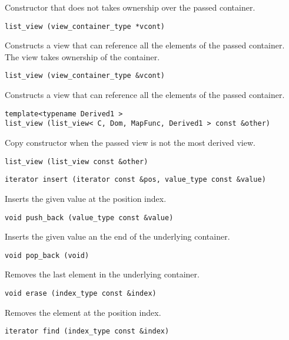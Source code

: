 Constructor that does not takes ownership over the passed container.

\begin{verbatim}
list_view (view_container_type *vcont)
\end{verbatim}

Constructs a view that can reference all the elements of the passed container. The view takes ownership of the container.

\begin{verbatim}
list_view (view_container_type &vcont)
\end{verbatim}

Constructs a view that can reference all the elements of the passed container.

\begin{verbatim}
template<typename Derived1 >
list_view (list_view< C, Dom, MapFunc, Derived1 > const &other)
\end{verbatim}

Copy constructor when the passed view is not the most derived view.

\begin{verbatim}
list_view (list_view const &other)
\end{verbatim}

\begin{verbatim}
iterator insert (iterator const &pos, value_type const &value)
\end{verbatim}

Inserts the given value at the position index.

\begin{verbatim}
void push_back (value_type const &value)
\end{verbatim}

Inserts the given value an the end of the underlying container.

\begin{verbatim}
void pop_back (void)
\end{verbatim}

Removes the last element in the underlying container.

\begin{verbatim}
void erase (index_type const &index)
\end{verbatim}

Removes the element at the position index.

\begin{verbatim}
iterator find (index_type const &index)
\end{verbatim}

